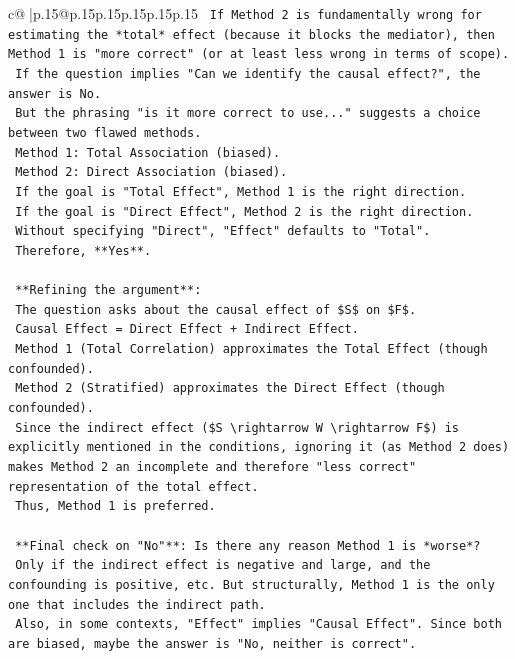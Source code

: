 \documentclass{article}
\begin{document}
{\begin{supertabular}{c@{$\;$}|p{.15\linewidth}@{}p{.15\linewidth}p{.15\linewidth}p{.15\linewidth}p{.15\linewidth}p{.15\linewidth}}
{{{\texttt{    If Method 2 is fundamentally wrong for estimating the *total* effect (because it blocks the mediator), then Method 1 is "more correct" (or at least less wrong in terms of scope).} \\
\texttt{    If the question implies "Can we identify the causal effect?", the answer is No.} \\
\texttt{    But the phrasing "is it more correct to use..." suggests a choice between two flawed methods.} \\
\texttt{    Method 1: Total Association (biased).} \\
\texttt{    Method 2: Direct Association (biased).} \\
\texttt{    If the goal is "Total Effect", Method 1 is the right direction.} \\
\texttt{    If the goal is "Direct Effect", Method 2 is the right direction.} \\
\texttt{    Without specifying "Direct", "Effect" defaults to "Total".} \\
\texttt{    Therefore, **Yes**.} \\
\\ 
\texttt{    **Refining the argument**:} \\
\texttt{    The question asks about the causal effect of \$S\$ on \$F\$.} \\
\texttt{    Causal Effect = Direct Effect + Indirect Effect.} \\
\texttt{    Method 1 (Total Correlation) approximates the Total Effect (though confounded).} \\
\texttt{    Method 2 (Stratified) approximates the Direct Effect (though confounded).} \\
\texttt{    Since the indirect effect (\$S \textbackslash{}rightarrow W \textbackslash{}rightarrow F\$) is explicitly mentioned in the conditions, ignoring it (as Method 2 does) makes Method 2 an incomplete and therefore "less correct" representation of the total effect.} \\
\texttt{    Thus, Method 1 is preferred.} \\
\\ 
\texttt{    **Final check on "No"**: Is there any reason Method 1 is *worse*?} \\
\texttt{    Only if the indirect effect is negative and large, and the confounding is positive, etc. But structurally, Method 1 is the only one that includes the indirect path.} \\
\texttt{    Also, in some contexts, "Effect" implies "Causal Effect". Since both are biased, maybe the answer is "No, neither is correct".} \\
}}}
\end{supertabular}}
\end{document}

